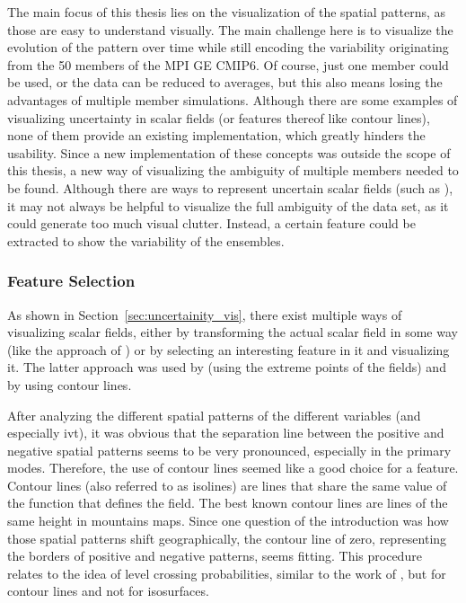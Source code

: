The main focus of this thesis lies on the visualization of the spatial patterns, as those are easy to understand visually.  
The main challenge here is to visualize the evolution of the pattern over time while still encoding the variability originating from the 50 members of the MPI GE CMIP6. 
Of course, just one member could be used, or the data can be reduced to averages, but this also means losing the advantages of multiple member simulations. 
Although there are some examples of visualizing uncertainty in scalar fields (or features thereof like contour lines), none of them provide an existing implementation, which greatly hinders the usability. 
Since a new implementation of these concepts was outside the scope of this thesis, a new way of visualizing the ambiguity of multiple members needed to be found. 
Although there are ways to represent uncertain scalar fields (such as \cite{coninx_visualization_2011}), it may not always be helpful to visualize the full ambiguity of the data set, as it could generate too much visual clutter. 
Instead, a certain feature could be extracted to show the variability of the ensembles.



\subsubsection{Feature Selection}

As shown in Section~\ref{sec:uncertainity_vis}, there exist multiple ways of visualizing scalar fields, either by transforming the actual scalar field in some way (like the approach of ) or by selecting an interesting feature in it and visualizing it. 
The latter approach was used by  (using the extreme points of the fields) and by \cite{sanyal_noodles_2010, whitaker_contour_2013} using contour lines.  

After analyzing the different spatial patterns of the different variables (and especially \ac{ivt}), it was obvious that the separation line between the positive and negative spatial patterns seems to be very pronounced, especially in the primary modes. 
Therefore, the use of contour lines seemed like a good choice for a feature. 
Contour lines (also referred to as isolines) are lines that share the same value of the function that defines the field. The best known contour lines are lines of the same height in mountains maps.  
Since one question of the introduction was how those spatial patterns shift geographically, the contour line of zero, representing the borders of positive and negative patterns, seems fitting. 
This procedure relates to the idea of level crossing probabilities, similar to the work of , but for contour lines and not for isosurfaces.

